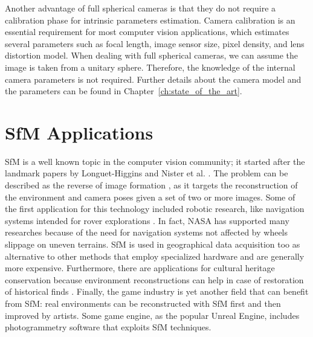 Another advantage of full spherical cameras is that they do not require a calibration phase for intrinsic parameters estimation. Camera calibration is an essential requirement for most computer vision applications, which estimates several parameters such as focal length, image 
sensor size, pixel density, and lens distortion model. When dealing with full spherical cameras, we can assume the image is taken from a unitary sphere. Therefore, the knowledge of the internal camera parameters is not required. 
Further details about the camera model and the parameters can be found in Chapter~\ref{ch:state_of_the_art}.

\section{SfM Applications}
SfM is a well known topic in the computer vision community; it started after 
the landmark papers by Longuet-Higgins \cite{longuet1981computer} and
Nister et al. \cite{moravec1980obstacle}.
The problem can be described as the reverse of image formation
\cite{Wei2013}, as it targets the reconstruction of the environment 
and camera poses given a set of two or more images.
Some of the first application for this technology included robotic research, 
like navigation systems intended for rover explorations 
\cite{moravec1980obstacle,durrant1996localization}. In fact, NASA has supported
many researches because of the need for navigation systems not affected by wheels
slippage on uneven terrains.
SfM is used in geographical data acquisition too
\cite{fonstad2013topographic, westoby2012structure, james2012straightforward}
as alternative to other methods that employ specialized hardware and are generally more expensive.
Furthermore, there are applications for cultural heritage conservation because 
environment reconstructions can help in case of restoration of historical finds
\cite{kraus2007photogrammetry}.
Finally, the game industry is yet another field that can benefit from 
SfM: real environments can be reconstructed with SfM first and then 
improved by artists. Some game engine, as the popular Unreal Engine,
includes photogrammetry software that exploits SfM techniques. 

